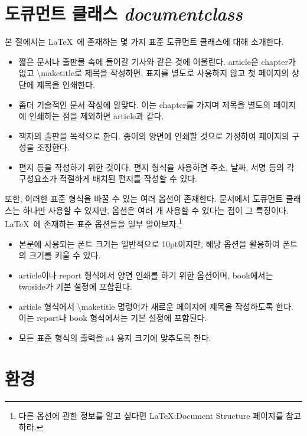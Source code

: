 \documentclass[a4paper, titlepage]{article}
\begin{document}
\section{도큐먼트 클래스 \emph{documentclass}}
본 절에서는 \LaTeX \ 에 존재하는 몇 가지 표준 도큐먼트 클래스에 대해 소개한다. 
\begin{itemize}
    \item [\textbf{article}] 짧은 문서나 출판물 속에 들어갈 기사와 같은 것에 어울린다. article은 chapter가 없고 \textbackslash maketitle로 제목을 작성하면, 표지를 별도로 사용하지 않고 첫 페이지의 상단에 제목을 인쇄한다.
    \item [\textbf{report}] 좀더 기술적인 문서 작성에 알맞다. 이는 chapter를 가지며 제목을 별도의 페이지에 인쇄하는 점을 제외하면 article과 같다.
    \item [\textbf{book}] 책자의 출판을 목적으로 한다. 종이의 양면에 인쇄할 것으로 가정하여 페이지의 구성을 조정한다.
    \item [\textbf{letter}] 편지 등을 작성하기 위한 것이다. 편지 형식을 사용하면 주소, 날짜, 서명 등의 각 구성요소가 적절하게 배치된 편지를 작성할 수 있다.
\end{itemize}

또한, 이러한 표준 형식을 바꿀 수 있는 여러 옵션이 존재한다. 문서에서 도큐먼트 클래스는 하나만 사용할 수 있지만, 옵션은 여러 개 사용할 수 있다는 점이 그 특징이다. \LaTeX \ 에 존재하는 표준 옵션들을 일부 알아보자.\footnote{다른 옵션에 관한 정보를 알고 싶다면 \LaTeX :Document Structure 페이지를 참고하라.}  
\begin{itemize}
    \item [\textbf{11pt, 12pt}] 본문에 사용되는 폰트 크기는 일반적으로 10pt이지만, 해당 옵션을 활용하여 폰트의 크기를 키울 수 있다.
    \item [\textbf{twoside}] article이나 report 형식에서 양면 인쇄를 하기 위한 옵션이며, book에서는 twoside가 기본 설정에 포함된다. 
    \item [\textbf{titlepage}] article 형식에서 \textbackslash maketitle 명령어가 새로운 페이지에 제목을 작성하도록 한다. 이는 report나 book 형식에서는 기본 설정에 포함된다. 
    \item [\textbf{a4paper}] 모든 표준 형식의 출력을 a4 용지 크기에 맞추도록 한다.  
\end{itemize}

\section{환경}
\end{document}
